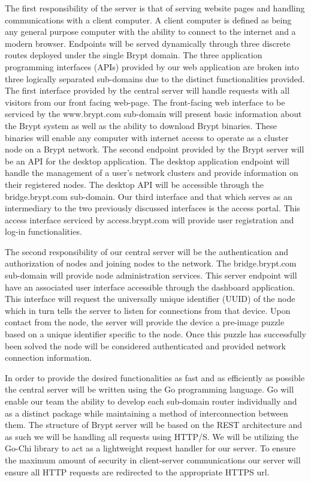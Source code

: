 \documentclass[tikz,a4paper,titlepage]{article}
\begin{document}
The first responsibility of the server is that of serving website pages and handling communications with a client computer. A client computer is defined as being any general purpose computer with the ability to connect to the internet and a modern browser. Endpoints will be served dynamically through three discrete routes deployed under the single Brypt domain. The three application programming interfaces (APIs) provided by our web application are broken into three logically separated sub-domains due to the distinct functionalities provided. The first interface provided by the central server will handle requests with all visitors from our front facing web-page. The front-facing web interface to be serviced by the www.brypt.com sub-domain will present basic information about the Brypt system as well as the ability to download Brypt binaries. These binaries will enable any computer with internet access to operate as a cluster node on a Brypt network. The second endpoint provided by the Brypt server will be an API for the desktop application. The desktop application endpoint will handle the management of a user’s network clusters and provide information on their registered nodes. The desktop API will be accessible through the bridge.brypt.com sub-domain. Our third interface and that which serves as an intermediary to the two previously discussed interfaces is the access portal. This access interface serviced by access.brypt.com will provide user registration and log-in functionalities.

The second responsibility of our central server will be the authentication and authorization of nodes and joining nodes to the network. The bridge.brypt.com sub-domain will provide node administration services. This server endpoint will have an associated user interface accessible through the dashboard application. This interface will request the universally unique identifier (UUID) of the node which in turn tells the server to listen for connections from that device. Upon contact from the node, the server will provide the device a pre-image puzzle based on a unique identifier specific to the node. Once this puzzle has successfully been solved the node will be considered authenticated and provided network connection information.

In order to provide the desired functionalities as fast and as efficiently as possible the central server will be written using the Go programming language. Go will enable our team the ability to develop each sub-domain router individually and as a distinct package while maintaining a method of interconnection between them. The structure of Brypt server will be based on the REST architecture and as such we will be handling all requests using HTTP/S. We will be utilizing the Go-Chi library to act as a lightweight request handler for our server. To ensure the maximum amount of security in client-server communications our server will ensure all HTTP requests are redirected to the appropriate HTTPS url.
\end{document}
